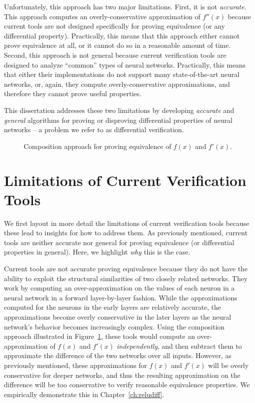 Unfortunately, this approach has two major limitations. First, it is not
\textit{accurate}. This approach computes an overly-conservative approximation of
$ f''(x) $ because current tools are not designed specifically for proving
equivalence (or any differential property). Practically, this means that this
approach either cannot prove equivalence at all, or it cannot do so in a
reasonable amount of time. Second, this approach is not general because current
verification tools are designed to analyze ``common'' types of neural networks.
Practically, this means that either their implementations do not support many
state-of-the-art neural networks, or, again, they compute overly-conservative
approximations, and therefore they cannot prove useful properties.


This dissertation addresses these two limitations by developing \textit{accurate}
and \textit{general} algorithms for proving or disproving differential properties
of neural networks -- a problem we refer to as differential verification.

\begin{figure}
	\centering
	\scalebox{1.0}{}
	\caption{Composition approach for proving equivalence of $ f(x) $ and $ f'(x)
	$.}
	\label{fig:subbed_nnets_intro}
\end{figure}

\section{Limitations of Current Verification Tools}
We first layout in more detail the limitations of current verification tools
because these lead to insights for how to address them. As previously mentioned,
current tools are neither accurate nor general for proving equivalence (or differential
properties in general). Here, we highlight \textit{why} this is the case.

Current tools are not accurate proving equivalence because they do not have the
ability to exploit the structural similarities of two closely related
networks. They work by computing an
over-approximation on the values of each neuron in a neural network in a forward
layer-by-layer fashion. While the approximations computed for the neurons in the
early layers are relatively accurate, the approximations become overly
conservative in the later layers as the neural network's behavior becomes
increasingly complex. Using the composition
approach illustrated in Figure~\ref{fig:subbed_nnets_intro}, these tools would
compute an
over-approximation of $ f(x) $ and $ f'(x) $  \textit{independently}, and then
subtract them to approximate the difference of the two networks over all inputs.
However, as previously mentioned, these approximations for $ f(x) $ and $ f'(x) $ will
be overly
conservative for deeper networks, and thus the resulting approximation on the
difference will be too conservative to verify reasonable equivalence properties.
We empirically demonstrate this in Chapter~\ref{ch:reludiff}.

